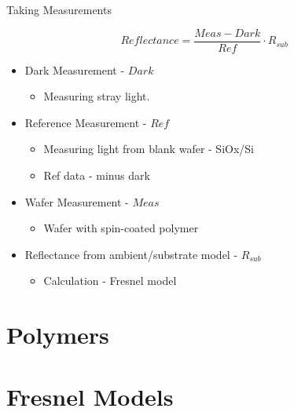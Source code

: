 \documentclass[10pt]{beamer}
\begin{document}
\begin{frame}{Taking Measurements}

\begin{equation*}
Reflectance = \frac{Meas-Dark}{Ref}\cdot R_{sub}
\end{equation*}

\begin{itemize}
\item Dark Measurement - $Dark$\\
\begin{itemize}
\item Measuring stray light.
\end{itemize}
\item Reference Measurement - $Ref$\\
\begin{itemize}
\item Measuring light from blank wafer - SiOx/Si
\item Ref data - minus dark
\end{itemize}
\item Wafer Measurement - $Meas$\\
\begin{itemize}
\item Wafer with spin-coated polymer
\end{itemize}
\item Reflectance from ambient/substrate model - $R_{sub}$
\begin{itemize}
\item Calculation - Fresnel model
\end{itemize}
\end{itemize}

\end{frame}



	\section{Polymers}

	

	
	\section{Fresnel Models}
	
\end{document}
